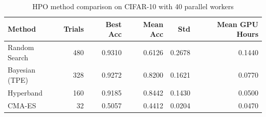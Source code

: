 \begin{table}
\caption{HPO method comparison on CIFAR-10 with 40 parallel workers}
\label{tab:summary}
\begin{tabular}{lrrrrr}
\toprule
Method & Trials & Best Acc & Mean Acc & Std & Mean GPU Hours \\
\midrule
Random Search & 480 & 0.9310 & 0.6126 & 0.2678 & 0.1440 \\
Bayesian (TPE) & 328 & 0.9272 & 0.8200 & 0.1621 & 0.0770 \\
Hyperband & 160 & 0.9185 & 0.8442 & 0.1430 & 0.0500 \\
CMA-ES & 32 & 0.5057 & 0.4412 & 0.0204 & 0.0470 \\
\bottomrule
\end{tabular}
\end{table}
